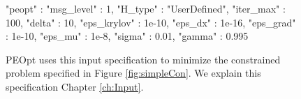 \begin{figure}
    \begin{lstPeoptJSON}
{
   "peopt" : {
      "msg_level" : 1,
      "H_type" : "UserDefined",
      "iter_max" : 100,
      "delta" : 10,
      "eps_krylov" : 1e-10,
      "eps_dx" : 1e-16,
      "eps_grad" : 1e-10,
      "eps_mu" : 1e-8,
      "sigma" : 0.01,
      "gamma" : 0.995
   }
}
\end{lstPeoptJSON}
    \caption{PEOpt uses this input specification to minimize the constrained problem specified in Figure \ref{fig:simpleCon}.  We explain this specification Chapter \ref{ch:Input}.} 
    \label{fig:simpleConJSON}
\end{figure}
